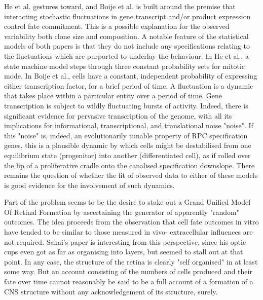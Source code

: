  He et al. gestures toward, and Boije et al. is built around the premise that interacting stochastic fluctuations in gene transcript and/or product expression control fate commitment. This is a possible explanation for the observed variability both clone size and composition. A notable feature of the statistical models of both papers is that they do not include any specifications relating to the fluctuations which are purported to underlay the behaviour. In He et al., a state machine model steps through three constant probability sets for mitotic mode. In Boije et al., cells have a constant, independent probability of expressing either transcription factor, for a brief period of time. A fluctuation is a dynamic that takes place within a particular entity over a period of time. Gene transcription is subject to wildly fluctuating bursts of activity. Indeed, there is significant evidence for pervasive transcription of the genome, with all its implications for informational, transcriptional, and translational noise "noise". If this "noise" is, indeed, an evolutionarily tunable property of RPC specification genes, this is a plausible dynamic by which cells might be destabilised from one equilibrium state (progenitor) into another (differentiated cell), as if rolled over the lip of a proliferative cradle onto the canalised specification downslope. There remains the question of whether the fit of observed data to either of these models is good evidence for the involvement of such dynamics. 

Part of the problem seems to be the desire to stake out a Grand Unified Model Of Retinal Formation by ascertaining the generator of apparently "random" outcomes. The idea proceeds from the observation that cell fate outcomes in vitro have tended to be similar to those measured in vivo- extracellular influences are not required. Sakai's paper \cite{Nakano2012} is interesting from this perspective, since his optic cups even got as far as organising into layers, but seemed to stall out at that point. In any case, the structure of the retina is clearly "self organised" in at least some way. But an account consisting of the numbers of cells produced and their fate over time cannot reasonably be said to be a full account of a formation of a CNS structure without any acknowledgement of its structure, surely.

